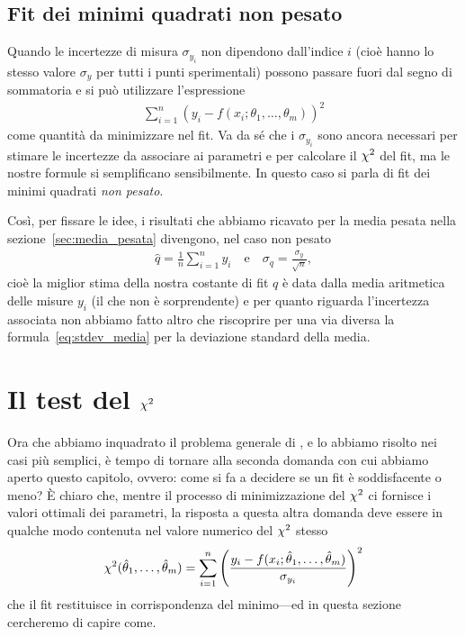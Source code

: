 \subsection{Fit dei minimi quadrati non pesato}

Quando le incertezze di misura $\sigma_{y_i}$ non dipendono dall'indice $i$
(cioè hanno lo stesso valore $\sigma_y$ per tutti i punti sperimentali)
possono passare fuori dal segno di sommatoria e si può utilizzare
l'espressione
\begin{align*}
  \sum_{i = 1}^n (y_i - f(x_i; \theta_1, \ldots, \theta_m))^2
\end{align*}
come quantità da minimizzare nel fit. Va da sé che i $\sigma_{y_i}$ sono
ancora necessari per stimare le incertezze da associare ai parametri e per
calcolare il $\chi^2$ del fit, ma le nostre formule si semplificano
sensibilmente. In questo caso si parla di fit dei minimi quadrati
\emph{non pesato}.

Così, per fissare le idee, i risultati che abbiamo ricavato per la media
pesata nella sezione~\ref{sec:media_pesata} divengono, nel caso non pesato
\begin{align}
  \hat{q} = \frac{1}{n}\sum_{i = 1}^n y_i \quad \text{e} \quad
  \sigma_q = \frac{\sigma_y}{\sqrt{n}},
\end{align}
cioè la miglior stima della nostra costante di fit $q$ è data dalla media
aritmetica delle misure $y_i$ (il che non è sorprendente) e per quanto
riguarda l'incertezza associata non abbiamo fatto altro che riscoprire per una
via diversa la formula~\eqref{eq:stdev_media} per la deviazione standard della
media.


\section{Il test del \texorpdfstring{$\chi^2$}{chi2}}
\label{sec:test_chi2}

Ora che abbiamo inquadrato il problema generale di \bestfit, e lo abbiamo
risolto nei casi più semplici, è tempo di tornare alla seconda domanda
con cui abbiamo aperto questo capitolo, ovvero: come si fa a decidere se un
fit è soddisfacente o meno? \`E chiaro che, mentre il processo di
minimizzazione del $\chi^2$ ci fornisce i valori ottimali dei parametri, la
risposta a questa altra domanda deve essere in qualche modo contenuta nel
valore numerico del $\chi^2$ stesso
\begin{align*}
  \chisquare{\hat{\theta}_1,\ldots,\hat{\theta}_m} = \sum_{i = 1}^{n}\left(
  \frac{y_i - f(x_i; \hat{\theta}_1,\ldots,\hat{\theta}_m)}{\sigma_{y_i}}
  \right)^2
\end{align*}
che il fit restituisce in corrispondenza del minimo---ed in questa sezione
cercheremo di capire come.


